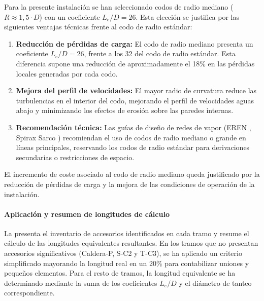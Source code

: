 \documentclass[12pt]{article}
\begin{document}
Para la presente instalación se han seleccionado codos de radio mediano ($R \approx 1{,}5 \cdot D$) con un coeficiente $L_e/D = 26$. Esta elección se justifica por las siguientes ventajas técnicas frente al codo de radio estándar:

\begin{enumerate}[label=\arabic*., leftmargin=2em]
	\item \textbf{Reducción de pérdidas de carga:} El codo de radio mediano presenta un coeficiente $L_e/D = 26$, frente a los 32 del codo de radio estándar. Esta diferencia supone una reducción de aproximadamente el 18\% en las pérdidas locales generadas por cada codo.
	\item \textbf{Mejora del perfil de velocidades:} El mayor radio de curvatura reduce las turbulencias en el interior del codo, mejorando el perfil de velocidades aguas abajo y minimizando los efectos de erosión sobre las paredes internas.
	\item \textbf{Recomendación técnica:} Las guías de diseño de redes de vapor (EREN \cite{EREN2015}, Spirax Sarco \cite{SpiraxSarco2020}) recomiendan el uso de codos de radio mediano o grande en líneas principales, reservando los codos de radio estándar para derivaciones secundarias o restricciones de espacio.
\end{enumerate}

El incremento de coste asociado al codo de radio mediano queda justificado por la reducción de pérdidas de carga y la mejora de las condiciones de operación de la instalación.

\paragraph{Aplicación y resumen de longitudes de cálculo}

La  presenta el inventario de accesorios identificados en cada tramo y resume el cálculo de las longitudes equivalentes resultantes. En los tramos que no presentan accesorios significativos (Caldera-P, S-C2 y T-C3), se ha aplicado un criterio simplificado mayorando la longitud real en un 20\% para contabilizar uniones y pequeños elementos. Para el resto de tramos, la longitud equivalente se ha determinado mediante la suma de los coeficientes $L_e/D$ y el diámetro de tanteo correspondiente.
\end{document}
